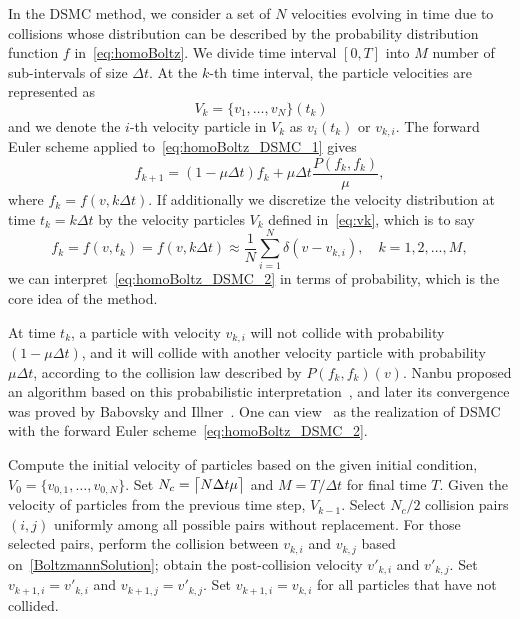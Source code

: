 \documentclass[times,final,nopreprintline]{elsarticle}
\DeclarePairedDelimiter{\ceil}{\lceil}{\rceil}
\begin{document}
In the DSMC method, we consider a set of $N$ velocities evolving in time due to collisions whose distribution can be described by the probability distribution function $f$ in~\eqref{eq:homoBoltz}. We divide time interval $[0,T]$ into $M$ number of sub-intervals of size $\Delta t$. At the $k$-th time interval, the particle velocities are represented as
\begin{equation}~\label{eq:vk}
V_k =\{v_1, \ldots , v_N\} (t_k)
\end{equation}
and we denote the $i$-th velocity particle in $V_k$ as $v_i(t_k)$ or $v_{k,i}$.
The forward Euler scheme applied to~\eqref{eq:homoBoltz_DSMC_1} gives
\begin{equation}\label{eq:homoBoltz_DSMC_2}
    f_{k+1} = (1-\mu\Delta t) f _k + \mu\Delta t\dfrac{P(f _k,f _k)}{\mu},
\end{equation}
where $f _k = f(v,k\Delta t)$. 
If additionally we discretize the velocity distribution at time $t_k = k\Delta t$ by the velocity particles $V_k$ defined in~\eqref{eq:vk}, which is to say
\begin{equation*} %
f _k = f(v,t_k) = f(v,k\Delta t) \approx \frac{1}{N}\sum_{i=1}^N \delta(v-v_{k,i}),\quad k=1,2,\dots,M,
\end{equation*}
we can interpret~\eqref{eq:homoBoltz_DSMC_2} in terms of probability, which is the core idea of the method. 

At time $t_k$, a particle with velocity $v_{k,i}$ will not collide with probability $(1-\mu\Delta t)$, and it will collide with another velocity particle with probability $\mu\Delta t$, according to the collision law described by $P(f _k,f _k)(v)$. Nanbu proposed an algorithm based on this probabilistic interpretation~\cite{nanbu1980direct},  and later its convergence was proved by Babovsky and Illner~\cite{babovsky1989convergence}. One can view~ as the realization of DSMC with the forward Euler scheme~\eqref{eq:homoBoltz_DSMC_2}.



\begin{algorithm}[ht!]
  \caption{Nanbu--Babovsky Algorithm for Maxwellian Molecules\label{alg:DSMC}}
\begin{algorithmic}[1]
\State Compute the initial velocity of particles based on the given initial condition, $V_0 = \{v_{0,1},\dots,v_{0,N}\}$. Set $N_c =\ceil[\big]{N\Delta t \mu}$ and $M=T/\Delta t$ for final time $T$.
\State Given the velocity of particles from the previous time step, $V_{k-1}$.
\State Select $N_c/2$  collision pairs $(i,j)$ uniformly among all possible pairs without replacement.
\State For those selected pairs, perform the collision between $v_{k,i}$ and $v_{k,j}$ based on~\eqref{BoltzmannSolution}; obtain the post-collision velocity ${v}'_{k,i}$ and ${v}'_{k,j}$.
\State Set $v_{k+1,i} = {v}'_{k,i}$ and $v_{k+1,j} = {v}'_{k,j}$.
\State Set $v_{k+1,i} = {v}_{k,i}$ for all particles that have not collided.
\EndFor
\end{algorithmic}
\end{algorithm}
\end{document}
